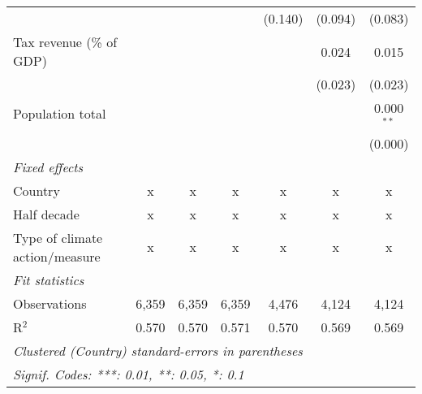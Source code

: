 \begin{tabular}{lcccccc}
                                                    &               &                &                & (0.140)        & (0.094)        & (0.083)\\   
   Tax revenue (\% of GDP)                          &               &                &                &                & 0.024          & 0.015\\   
                                                    &               &                &                &                & (0.023)        & (0.023)\\   
   Population total                                 &               &                &                &                &                & 0.000$^{**}$\\   
                                                    &               &                &                &                &                & (0.000)\\   
   \emph{Fixed effects}\\
   Country                                          & x             & x              & x              & x              & x              & x\\  
   Half decade                                      & x             & x              & x              & x              & x              & x\\  
   Type of climate action/measure                   & x             & x              & x              & x              & x              & x\\  
   \midrule \emph{Fit statistics}\\
   Observations                                     & 6,359         & 6,359          & 6,359          & 4,476          & 4,124          & 4,124\\  
   R$^2$                                            & 0.570         & 0.570          & 0.571          & 0.570          & 0.569          & 0.569\\  
   \midrule
   \multicolumn{7}{l}{\emph{Clustered (Country) standard-errors in parentheses}}\\
   \multicolumn{7}{l}{\emph{Signif. Codes: ***: 0.01, **: 0.05, *: 0.1}}\\
\end{tabular}
\par\endgroup


